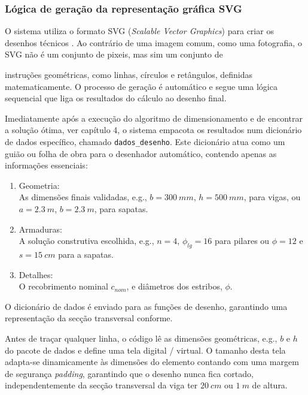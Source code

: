 \subsubsection{Lógica de geração da representação gráfica SVG}
O sistema utiliza o formato SVG (\textit{Scalable Vector Graphics}) para criar os desenhos técnicos \cite{DjangoDocs,DaileySVG,TikZManual,TikZGoncalves}. Ao contrário de uma imagem comum, como uma fotografia, o SVG não é um conjunto de pixeis, mas sim um conjunto de {instruções geométricas, como linhas, círculos e retângulos, definidas matematicamente. O processo de geração é automático e segue uma lógica sequencial que liga os resultados do cálculo ao desenho final.

Imediatamente após a execução do algoritmo de dimensionamento e de encontrar a solução ótima, ver capítulo 4, o sistema empacota os resultados num dicionário de dados específico, chamado \texttt{dados\_desenho}. Este dicionário atua como um guião ou folha de obra para o desenhador automático, contendo apenas as informações essenciais:

\begin{enumerate}
    \item Geometria:\\
    As dimensões finais validadas, e.g., $b = \SI{300}{mm}$, $h = \SI{500}{mm}$, para vigas, ou $a = \SI{2.3}{m}$, $b = \SI{2.3}{m}$, para sapatas.
    \item Armaduras:\\
    A solução construtiva escolhida, e.g., $n = 4$, $\phi_{lg} = 16$ para pilares ou $\phi = 12$ e $s = \SI{15}{cm}$ para a sapatas.
    \item Detalhes:\\
    O recobrimento nominal $c_{nom}$, e diâmetros dos estribos, $\phi$.
\end{enumerate}

O dicionário de dados é enviado para as funções de desenho, garantindo uma representação da secção transversal conforme.

Antes de traçar qualquer linha, o código lê as dimensões geométricas, e.g., $b$ e $h$ do pacote de dados e define uma tela digital / virtual. O tamanho desta tela adapta-se dinamicamente às dimensões do elemento contando com uma margem de segurança \textit{padding}, garantindo que o desenho nunca fica cortado, independentemente da secção transversal da viga ter $\SI{20}{cm}$ ou $\SI{1}{m}$ de altura.

}
